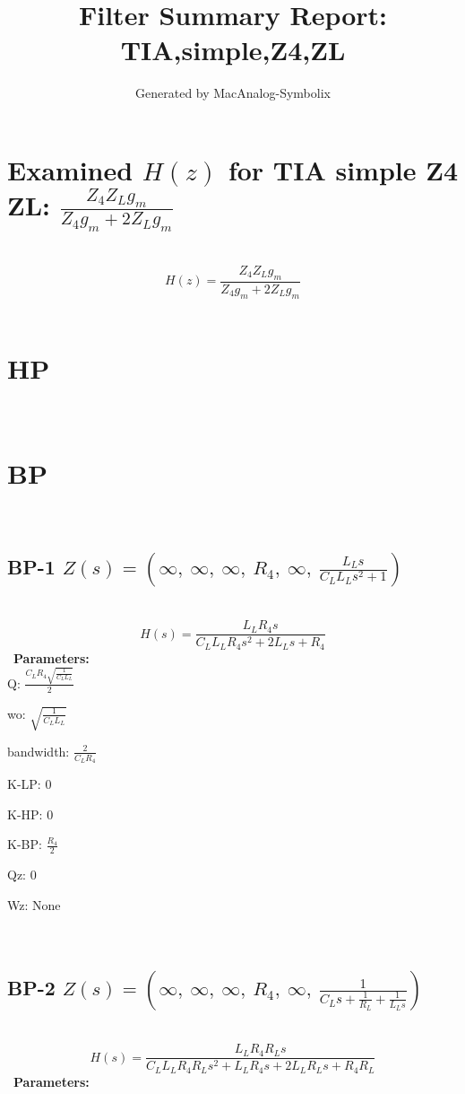 \documentclass{article}
\begin{document}
        
                        \title{Filter Summary Report: TIA,simple,Z4,ZL}
                        \author{Generated by MacAnalog-Symbolix}
                        \maketitle

                        \tableofcontents
                        \newpage
                        \section{Examined $H(z)$ for TIA simple Z4 ZL: $\frac{Z_{4} Z_{L} g_{m}}{Z_{4} g_{m} + 2 Z_{L} g_{m}}$ }\ 
\textbf{\[H(z) = \frac{Z_{4} Z_{L} g_{m}}{Z_{4} g_{m} + 2 Z_{L} g_{m}}\] }\ 
\section{HP}\ 
\section{BP}\ 
\subsection{BP-1 $Z(s) = \left( \infty, \  \infty, \  \infty, \  R_{4}, \  \infty, \  \frac{L_{L} s}{C_{L} L_{L} s^{2} + 1}\right)$ } \ 
\textbf{\[H(s) = \frac{L_{L} R_{4} s}{C_{L} L_{L} R_{4} s^{2} + 2 L_{L} s + R_{4}}\] } \ 
\textbf{Parameters:}\\ 

Q: $\frac{C_{L} R_{4} \sqrt{\frac{1}{C_{L} L_{L}}}}{2}$\ 

wo: $\sqrt{\frac{1}{C_{L} L_{L}}}$\ 

bandwidth: $\frac{2}{C_{L} R_{4}}$\ 

K-LP: $0$\ 

K-HP: $0$\ 

K-BP: $\frac{R_{4}}{2}$\ 

Qz: $0$\ 

Wz: $\text{None}$\ 

\ 

\subsection{BP-2 $Z(s) = \left( \infty, \  \infty, \  \infty, \  R_{4}, \  \infty, \  \frac{1}{C_{L} s + \frac{1}{R_{L}} + \frac{1}{L_{L} s}}\right)$ } \ 
\textbf{\[H(s) = \frac{L_{L} R_{4} R_{L} s}{C_{L} L_{L} R_{4} R_{L} s^{2} + L_{L} R_{4} s + 2 L_{L} R_{L} s + R_{4} R_{L}}\] } \ 
\textbf{Parameters:}\\ 
\end{document}
